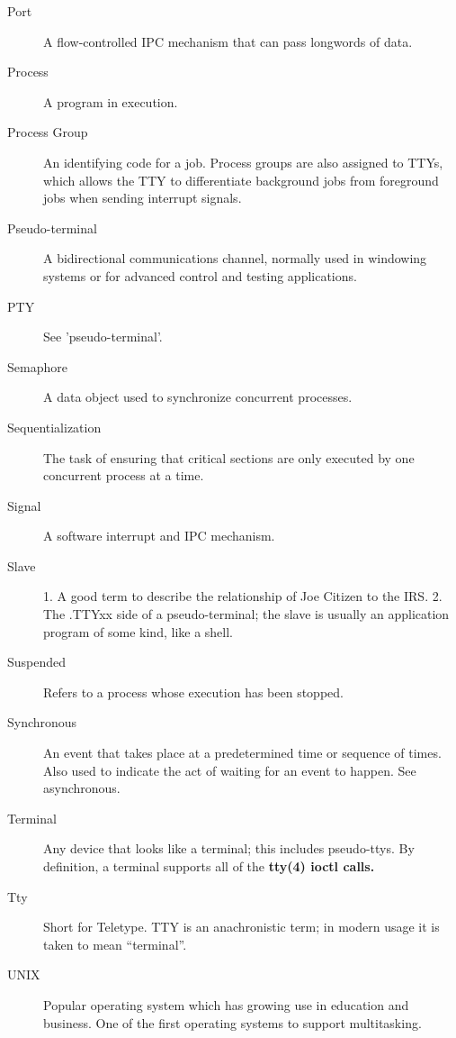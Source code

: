 \documentclass{report}
\begin{document}
\begin{description}
\item[Port]
	A flow-controlled IPC mechanism that can pass longwords of data.
\item[Process]
	A program in execution.
\item[Process Group]
	An identifying code for a job. Process groups are also assigned
	to TTYs, which allows the TTY to differentiate  
	background jobs	from foreground jobs when sending interrupt signals.
\item[Pseudo-terminal]
	A bidirectional communications channel, normally used in windowing
	systems or for advanced control and testing applications.
\item[PTY]
	See 'pseudo-terminal'.
\item[Semaphore]
	A data object used to synchronize concurrent processes.
\item[Sequentialization]
	The task of ensuring that critical sections are only executed by one
	concurrent process at a time.
\item[Signal]
	A software interrupt and IPC mechanism.
\item[Slave]
	1. A good term to describe the relationship of Joe Citizen to the IRS.
	2. The  .TTYxx side of a pseudo-terminal; the slave
	is usually an application program of some kind, like a shell.
\item[Suspended]
	Refers to a process whose execution has been stopped.
\item[Synchronous]
	An event that takes place at a predetermined time or sequence of times.
	Also used to indicate the act of waiting for an event to happen. See
	asynchronous.
\item[Terminal]
	Any device that looks like a terminal; this includes pseudo-ttys. By
	definition, a terminal supports all of the \bf tty\rm(4)
	ioctl calls.
\item[Tty]
	Short for Teletype. TTY is an anachronistic term; in modern usage
	it is taken to mean ``terminal''.
\item[UNIX]
	Popular operating system which has growing use in education and
	business.  One of the first operating systems to support multitasking.
\end{description}

\printindex
\end{document}
